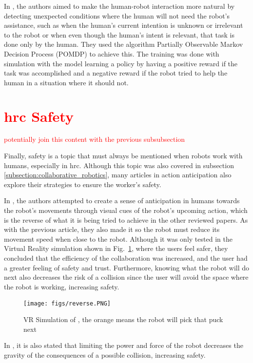 In \textcite{Gorur2018}, the authors aimed to make the human-robot interaction more natural by detecting unexpected conditions where the human will not need the robot's assistance, such as when the human's current intention is unknown or irrelevant to the robot or when even though the human's intent is relevant, that task is done only by the human. They used the algorithm Partially Observable Markov Decision Process (POMDP) to achieve this. The training was done with simulation with the model learning a policy by having a positive reward if the task was accomplished and a negative reward if the robot tried to help the human in a situation where it should not.

\section{\textcolor{red}{\acl{hrc} Safety}}

\textcolor{red}{potentially join this content with the previous subsubsection}

Finally, safety is a topic that must always be mentioned when robots work with humans, especially in \acs{hrc}. Although this topic was also covered in subsection \ref{subsection:collaborative_robotics}, many articles in action anticipation also explore their strategies to ensure the worker's safety.

In \cite{Psarakis2022}, the authors attempted to create a sense of anticipation in humans towards the robot's movements through visual cues of the robot's upcoming action, which is the reverse of what it is being tried to achieve in the other reviewed papers. As with the previous article, they also made it so the robot must reduce its movement speed when close to the robot. Although it was only tested in the Virtual Reality simulation shown in Fig.~\ref{vr}, where the users feel safer, they concluded that the efficiency of the collaboration was increased, and the user had a greater feeling of safety and trust. Furthermore, knowing what the robot will do next also decreases the risk of a collision since the user will avoid the space where the robot is working, increasing safety.

\begin{figure}[H]
\centerline{\texttt{[image: figs/reverse.PNG]}}
\caption{VR Simulation of \cite{Psarakis2022}, the orange means the robot will pick that puck next}
\label{vr}
\end{figure}

In \cite{Mukherjee2022}, it is also stated that limiting the power and force of the robot decreases the gravity of the consequences of a possible collision, increasing safety.
\fi